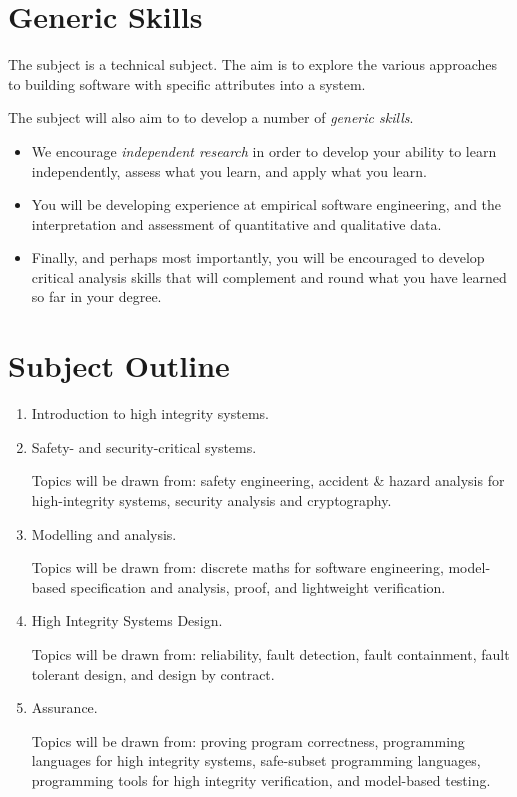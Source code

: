 \documentclass{article}
\begin{document}
\section*{Generic Skills}

The subject is a technical subject. The aim is to explore the various
approaches to building software with specific attributes into a
system.

The subject will also aim to to develop a number of {\em generic
skills}.

\begin{itemize}

  \item We encourage {\em independent research} in order to develop
    your ability to learn independently, assess what you learn, and
    apply what you learn.
  
  \item You will be developing experience at empirical software
    engineering, and the interpretation and assessment of quantitative
    and qualitative data.
  
  \item Finally, and perhaps most importantly, you will be encouraged
    to develop critical analysis skills that will complement and round
    what you have learned so far in your degree.

\end{itemize}

\section*{Subject Outline}

\begin{enumerate}[{Part} I:]

 \item Introduction to high integrity systems.

 \item Safety- and security-critical systems.

   Topics will be drawn from: safety engineering, accident \& hazard analysis for high-integrity systems, security analysis and cryptography.

 \item  Modelling and analysis.

  Topics will be drawn from: discrete maths for software engineering, model-based specification and analysis, proof, and lightweight verification.

 \item High Integrity Systems Design.

  Topics will be drawn from: reliability, fault detection, fault containment, fault tolerant design, and design by contract.

 \item Assurance.

  Topics will be drawn from: proving program correctness, programming languages for high integrity systems, safe-subset programming languages, programming tools for high integrity verification, and   model-based testing.

\end{enumerate}
\end{document}
